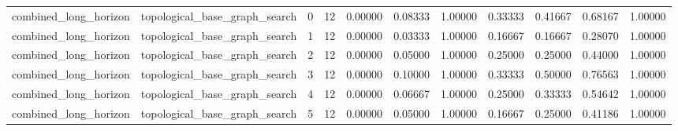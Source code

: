 \documentclass{article}
\begin{document}
\begin{table}[tbp]
{\begin{tabular}{lllllllllll}
combined\_long\_horizon & topological\_base\_graph\_search & 0 & 12 & 0.00000 & 0.08333 & 1.00000 & 0.33333 & 0.41667 & 0.68167 & 1.00000 \\
combined\_long\_horizon & topological\_base\_graph\_search & 1 & 12 & 0.00000 & 0.03333 & 1.00000 & 0.16667 & 0.16667 & 0.28070 & 1.00000 \\
combined\_long\_horizon & topological\_base\_graph\_search & 2 & 12 & 0.00000 & 0.05000 & 1.00000 & 0.25000 & 0.25000 & 0.44000 & 1.00000 \\
combined\_long\_horizon & topological\_base\_graph\_search & 3 & 12 & 0.00000 & 0.10000 & 1.00000 & 0.33333 & 0.50000 & 0.76563 & 1.00000 \\
combined\_long\_horizon & topological\_base\_graph\_search & 4 & 12 & 0.00000 & 0.06667 & 1.00000 & 0.25000 & 0.33333 & 0.54642 & 1.00000 \\
combined\_long\_horizon & topological\_base\_graph\_search & 5 & 12 & 0.00000 & 0.05000 & 1.00000 & 0.16667 & 0.25000 & 0.41186 & 1.00000 \\
\bottomrule
\end{tabular}
}
\end{table}

\clearpage
\end{document}
